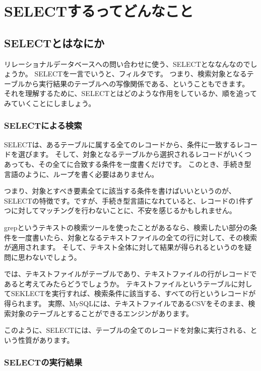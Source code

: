 \chapter{SELECTするってどんなこと}

\section{SELECTとはなにか}

リレーショナルデータベースへの問い合わせに使う、SELECTとななんなのでしょうか。
SELECTを一言でいうと、フィルタです。
つまり、検索対象となるテーブルから実行結果のテーブルへの写像関係である、ということもできます。
それを理解するために、SELECTとはどのような作用をしているか、順を追ってみていくことにしましょう。

\subsection{SELECTによる検索}

SELECTは、あるテーブルに属する全てのレコードから、条件に一致するレコードを選びます。
そして、対象となるテーブルから選択されるレコードがいくつあっても、その全てに合致する条件を一度書くだけです。
このとき、手続き型言語のように、ループを書く必要はありません。

つまり、対象とすべき要素全てに該当する条件を書けばいいというのが、SELECTの特徴です。ですが、手続き型言語になれていると、レコードの1件ずつに対してマッチングを行わないことに、不安を感じるかもしれません。

grepというテキストの検索ツールを使ったことがあるなら、検索したい部分の条件を一度書いたら、対象となるテキストファイルの全ての行に対して、その検索が適用されます。
そして、テキスト全体に対して結果が得られるというのを疑問に思わないでしょう。

では、テキストファイルがテーブルであり、テキストファイルの行がレコードであると考えてみたらどうでしょうか。
テキストファイルというテーブルに対してSEKLECTを実行すれば、検索条件に該当する、すべての行というレコードが得られます。
実際、MySQLには、テキストファイルであるCSVをそのまま、検索対象のテーブルとすることができるエンジンがあります。

このように、SELECTには、テーブルの全てのレコードを対象に実行される、という性質があります。

\subsection{SELECTの実行結果}

